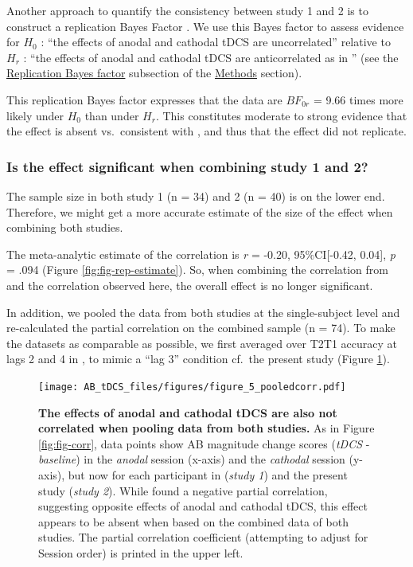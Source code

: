 \documentclass[11pt,english,]{memoir}
\begin{document}
Another approach to quantify the consistency between study 1 and 2 is to construct a replication Bayes Factor \autocite{Wagenmakers2016}. We use this Bayes factor to assess evidence for \(H_0\) : ``the effects of anodal and cathodal tDCS are uncorrelated'' relative to \(H_r\) : ``the effects of anodal and cathodal tDCS are anticorrelated as in \textcite{London2015}'' (see the \protect\hyperlink{repBF}{Replication Bayes factor} subsection of the \protect\hyperlink{AB_tDCS-methods}{Methods} section).

This replication Bayes factor expresses that the data are \(BF_{0r}\) = 9.66 times more likely under \(H_0\) than under \(H_r\). This constitutes moderate to strong evidence that the effect is absent vs.~consistent with \textcite{London2015}, and thus that the effect did not replicate.

\hypertarget{is-the-effect-significant-when-combining-study-1-and-2}{%
\subsubsection{Is the effect significant when combining study 1 and 2?}\label{is-the-effect-significant-when-combining-study-1-and-2}}

The sample size in both study 1 (n = 34) and 2 (n = 40) is on the lower end. Therefore, we might get a more accurate estimate of the size of the effect when combining both studies.

The meta-analytic estimate of the correlation is \emph{r} = -0.20, 95\%CI{[}-0.42, 0.04{]}, \emph{p} = .094 (Figure \ref{fig:fig-rep-estimate}). So, when combining the correlation from \textcite{London2015} and the correlation observed here, the overall effect is no longer significant.

In addition, we pooled the data from both studies at the single-subject level and re-calculated the partial correlation on the combined sample (n = 74). To make the datasets as comparable as possible, we first averaged over T2\textbar{}T1 accuracy at lags 2 and 4 in \textcite{London2015}, to mimic a ``lag 3'' condition cf.~the present study (Figure \ref{fig:fig-corr-pooled}).

\begin{figure}
\centering
\texttt{[image: AB\_tDCS\_files/figures/figure\_5\_pooledcorr.pdf]}
\caption{\label{fig:fig-corr-pooled}\textbf{The effects of anodal and cathodal tDCS are also not correlated when pooling data from both studies.} As in Figure \ref{fig:fig-corr}, data points show AB magnitude change scores (\emph{tDCS} - \emph{baseline}) in the \emph{anodal} session (x-axis) and the \emph{cathodal} session (y-axis), but now for each participant in \textcite{London2015} (\emph{study 1}) and the present study (\emph{study 2}). While \textcite{London2015} found a negative partial correlation, suggesting opposite effects of anodal and cathodal tDCS, this effect appears to be absent when based on the combined data of both studies. The partial correlation coefficient (attempting to adjust for Session order) is printed in the upper left.}
\end{figure}
\end{document}
